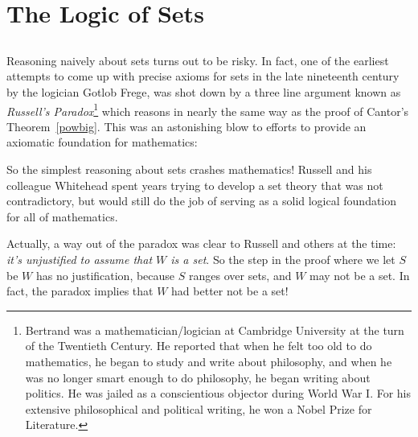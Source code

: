 \section{The Logic of Sets}\label{set_logic_sec}%

\subsection{}

Reasoning naively about sets turns out to be risky.  In fact, one of the
earliest attempts to come up with precise axioms for sets in the late
nineteenth century by the logician  Gotlob Frege, was
shot down by a three line argument known as \emph{Russell's
  Paradox}\footnote{Bertrand  was a mathematician/logician
  at Cambridge University at the turn of the Twentieth Century.  He
  reported that when he felt too old to do mathematics, he began to study
  and write about philosophy, and when he was no longer smart enough to do
  philosophy, he began writing about politics.  He was jailed as a
  conscientious objector during World War I.  For his extensive
  philosophical and political writing, he won a Nobel Prize for
  Literature.} which reasons in nearly the same way as the proof of
Cantor's Theorem~\ref{powbig}.  This was an astonishing blow to efforts to
provide an axiomatic foundation for mathematics:


So the simplest reasoning about sets crashes mathematics!  Russell and his
colleague Whitehead spent years trying to develop a set theory that was
not contradictory, but would still do the job of serving as a solid
logical foundation for all of mathematics.

Actually, a way out of the paradox was clear to Russell and others at
the time: \emph{it's unjustified to assume that $W$ is a set}.  So the
step in the proof where we let $S$ be $W$ has no justification,
because $S$ ranges over sets, and $W$ may not be a set.  In fact, the
paradox implies that $W$ had better not be a set!

